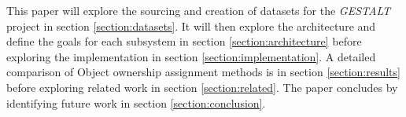 This paper will explore the sourcing and creation of datasets for the \textit{GESTALT} project in section \ref{section:datasets}. It will then explore the architecture and define the goals for each subsystem in section \ref{section:architecture} before exploring the implementation in section \ref{section:implementation}. A detailed comparison of Object ownership assignment methods is in section \ref{section:results} before exploring related work in section \ref{section:related}. The paper concludes by identifying future work in section \ref{section:conclusion}.  
